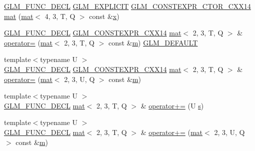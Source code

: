 \begin{DoxyCompactItemize}
\item 
\hyperlink{setup_8hpp_ab2d052de21a70539923e9bcbf6e83a51}{G\+L\+M\+\_\+\+F\+U\+N\+C\+\_\+\+D\+E\+CL} \hyperlink{setup_8hpp_a6c74f5a5e7b134ab69023ff9a30d4d5d}{G\+L\+M\+\_\+\+E\+X\+P\+L\+I\+C\+IT} \hyperlink{setup_8hpp_a0900f9145e68bf6061b6f5e7be3fa751}{G\+L\+M\+\_\+\+C\+O\+N\+S\+T\+E\+X\+P\+R\+\_\+\+C\+T\+O\+R\+\_\+\+C\+X\+X14} \hyperlink{structglm_1_1mat_3_012_00_013_00_01_t_00_01_q_01_4_a4c586529d0cf49309afb4ec2bbcb27f2}{mat} (\hyperlink{structglm_1_1mat}{mat}$<$ 4, 3, T, Q $>$ const \&\hyperlink{_s_d_l__opengl_8h_ad0e63d0edcdbd3d79554076bf309fd47}{x})
\item 
\hyperlink{setup_8hpp_ab2d052de21a70539923e9bcbf6e83a51}{G\+L\+M\+\_\+\+F\+U\+N\+C\+\_\+\+D\+E\+CL} \hyperlink{setup_8hpp_a4dd12abf5e1164bc57f3a34671d03844}{G\+L\+M\+\_\+\+C\+O\+N\+S\+T\+E\+X\+P\+R\+\_\+\+C\+X\+X14} \hyperlink{structglm_1_1mat}{mat}$<$ 2, 3, T, Q $>$ \& \hyperlink{structglm_1_1mat_3_012_00_013_00_01_t_00_01_q_01_4_aaea1ad3b980b3cdc31afe773e3902b80}{operator=} (\hyperlink{structglm_1_1mat}{mat}$<$ 2, 3, T, Q $>$ const \&\hyperlink{_s_d_l__opengl__glext_8h_af593500c283bf1a787a6f947f503a5c2}{m}) \hyperlink{setup_8hpp_aefce7051c376a64ba89fa93a9f63bc2c}{G\+L\+M\+\_\+\+D\+E\+F\+A\+U\+LT}
\item 
{\footnotesize template$<$typename U $>$ }\\\hyperlink{setup_8hpp_ab2d052de21a70539923e9bcbf6e83a51}{G\+L\+M\+\_\+\+F\+U\+N\+C\+\_\+\+D\+E\+CL} \hyperlink{setup_8hpp_a4dd12abf5e1164bc57f3a34671d03844}{G\+L\+M\+\_\+\+C\+O\+N\+S\+T\+E\+X\+P\+R\+\_\+\+C\+X\+X14} \hyperlink{structglm_1_1mat}{mat}$<$ 2, 3, T, Q $>$ \& \hyperlink{structglm_1_1mat_3_012_00_013_00_01_t_00_01_q_01_4_a6081b3f971290a780c85fff4786366b0}{operator=} (\hyperlink{structglm_1_1mat}{mat}$<$ 2, 3, U, Q $>$ const \&\hyperlink{_s_d_l__opengl__glext_8h_af593500c283bf1a787a6f947f503a5c2}{m})
\item 
{\footnotesize template$<$typename U $>$ }\\\hyperlink{setup_8hpp_ab2d052de21a70539923e9bcbf6e83a51}{G\+L\+M\+\_\+\+F\+U\+N\+C\+\_\+\+D\+E\+CL} \hyperlink{structglm_1_1mat}{mat}$<$ 2, 3, T, Q $>$ \& \hyperlink{structglm_1_1mat_3_012_00_013_00_01_t_00_01_q_01_4_a7b22ff32851ed8d087a0e90a78832ff6}{operator+=} (U \hyperlink{_s_d_l__opengl_8h_a4af680a6c683f88ed67b76f207f2e6e4}{s})
\item 
{\footnotesize template$<$typename U $>$ }\\\hyperlink{setup_8hpp_ab2d052de21a70539923e9bcbf6e83a51}{G\+L\+M\+\_\+\+F\+U\+N\+C\+\_\+\+D\+E\+CL} \hyperlink{structglm_1_1mat}{mat}$<$ 2, 3, T, Q $>$ \& \hyperlink{structglm_1_1mat_3_012_00_013_00_01_t_00_01_q_01_4_af7b5ca79c3075e5a7901b171e627da84}{operator+=} (\hyperlink{structglm_1_1mat}{mat}$<$ 2, 3, U, Q $>$ const \&\hyperlink{_s_d_l__opengl__glext_8h_af593500c283bf1a787a6f947f503a5c2}{m})

\end{DoxyCompactItemize}
